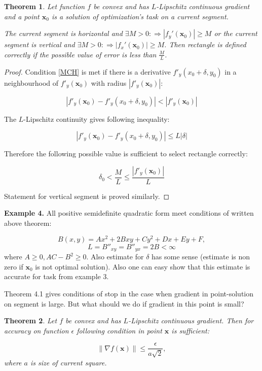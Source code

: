 \documentclass[12pt]{article}
\newtheorem{theorem}{Theorem}[section]
\begin{document}
\begin{theorem}
Let function $f$ be convex and has $L$-Lipschitz continuous gradient and a point $\textbf{x}_0$ is a solution of optimization's  task on a current segment. 

The current segment is horizontal and $\exists M>0  : \Rightarrow|f_y'(\textbf{x}_0)| \geq M$ or the current segment is vertical and $\exists M>0  : \Rightarrow|f_x'(\textbf{x}_0)| \geq M$. Then rectangle is defined correctly if the possible value of error is less than $\frac{M}{L}$.
\end{theorem}
\begin{proof}
Condition \eqref{MCH} is met if there is a derivative $f'_y(x_0+\delta, y_0)$ in a neighbourhood of 
$f'_y(\textbf{x}_0)$ with radius $\left|f'_y(\textbf{x}_0)\right|$:

$$\left|f'_y(\textbf{x}_0) - f'_y(x_0+\delta, y_0)\right|<\left|f'_y(\textbf{x}_0)\right|$$

The $L$-Lipschitz continuity gives following inequality:

$$\left|f'_y(\textbf{x}_0) - f'_y(x_0+\delta, y_0)\right| \leq L|\delta|$$

Therefore the following possible value is sufficient to select rectangle correctly:

$$\delta_0 < \frac{M}{L} \leq \frac{\left|f'_y(\textbf{x}_0)\right|}{L}$$

Statement for vertical segment is proved similarly.
\end{proof}

\textbf{Example 4.} All positive semidefinite quadratic form meet conditions of written above theorem:

$$B(x,y) = Ax^2 + 2Bxy + Cy^2 + Dx +Ey + F,$$
$$L = B''_{xy} = B''_{yx} = 2B < \infty$$
where $A \geq 0,AC - B^2\geq0$. Also estimate for $\delta$ has some sense (estimate is non zero if $\textbf{x}_0$ is not optimal solution). Also one can easy show that this estimate is accurate for task from example 3.

Theorem 4.1 gives conditions of stop in the case when gradient in point-solution on segment is large. But what should we do if gradient in this point is small?

\begin{theorem}
Let $f$ be convex and has $L$-Lipschitz continuous gradient. Then for accuracy on function $\epsilon$ following condition in point $\textbf{x}$ is sufficient:

$$\|\nabla f(\textbf{x})\|\leq \frac{\epsilon}{a\sqrt{2}}, $$
where $a$ is size of current square.
\end{theorem}
\end{document}
